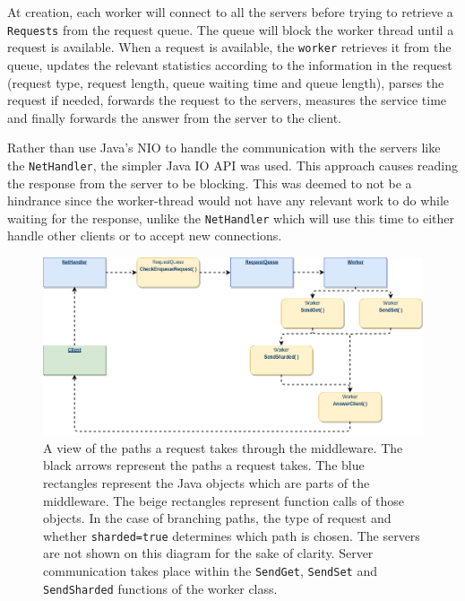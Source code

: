 \documentclass[11pt,a4paper]{article}
\begin{document}
At creation, each worker will connect to all the servers before trying to retrieve a \texttt{Requests} from the request queue. The queue will block the worker thread until a request is available. When a request is available, the \texttt{worker} retrieves it from the queue, updates the relevant statistics according to the information in the request (request type, request length, queue waiting time and queue length), parses the request if needed, forwards the request to the servers, measures the service time and finally forwards the answer from the server to the client.

Rather than use Java's NIO to handle the communication with the servers like the \texttt{NetHandler}, the simpler Java IO API was used. This approach causes reading the response from the server to be blocking. This was deemed to not be a hindrance since the worker-thread would not have any relevant work to do while waiting for the response, unlike the \texttt{NetHandler} which will use this time to either handle other clients or to accept new connections. 

\begin{figure}
\centering
\includegraphics[width=1\textwidth]{request_paths}
\caption{A view of the paths a request takes through the middleware. The black arrows represent the paths a request takes. The blue rectangles represent the Java objects which are parts of the middleware. The beige rectangles represent function calls of those objects. In the case of branching paths, the type of request and whether \texttt{sharded=true} determines which path is chosen. The servers are not shown on this diagram for the sake of clarity. Server communication takes place within the \texttt{SendGet}, \texttt{SendSet} and \texttt{SendSharded} functions of the worker class.}
\label{fig:request_paths}
\end{figure}
\end{document}
